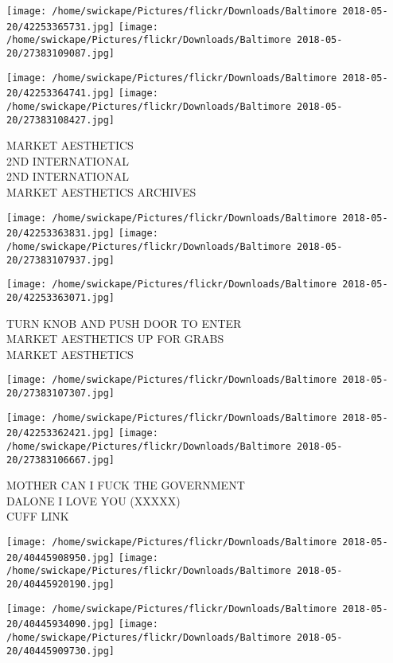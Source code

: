 \documentclass[10pt,letterpaper]{article}
\begin{document}
\texttt{[image: /home/swickape/Pictures/flickr/Downloads/Baltimore 2018-05-20/42253365731.jpg]}
\texttt{[image: /home/swickape/Pictures/flickr/Downloads/Baltimore 2018-05-20/27383109087.jpg]}

\texttt{[image: /home/swickape/Pictures/flickr/Downloads/Baltimore 2018-05-20/42253364741.jpg]}
\texttt{[image: /home/swickape/Pictures/flickr/Downloads/Baltimore 2018-05-20/27383108427.jpg]}

MARKET AESTHETICS\\
2ND INTERNATIONAL\\
2ND INTERNATIONAL\\
MARKET AESTHETICS ARCHIVES
\pagebreak

\texttt{[image: /home/swickape/Pictures/flickr/Downloads/Baltimore 2018-05-20/42253363831.jpg]}
\texttt{[image: /home/swickape/Pictures/flickr/Downloads/Baltimore 2018-05-20/27383107937.jpg]}

\texttt{[image: /home/swickape/Pictures/flickr/Downloads/Baltimore 2018-05-20/42253363071.jpg]}

TURN KNOB AND PUSH DOOR TO ENTER\\
MARKET AESTHETICS UP FOR GRABS\\
MARKET AESTHETICS
\pagebreak

\texttt{[image: /home/swickape/Pictures/flickr/Downloads/Baltimore 2018-05-20/27383107307.jpg]}

\vspace{0.25in}
\texttt{[image: /home/swickape/Pictures/flickr/Downloads/Baltimore 2018-05-20/42253362421.jpg]}
\texttt{[image: /home/swickape/Pictures/flickr/Downloads/Baltimore 2018-05-20/27383106667.jpg]}

MOTHER CAN I FUCK THE GOVERNMENT\\
DALONE I LOVE YOU (XXXXX)\\
CUFF LINK
\pagebreak

\texttt{[image: /home/swickape/Pictures/flickr/Downloads/Baltimore 2018-05-20/40445908950.jpg]}
\texttt{[image: /home/swickape/Pictures/flickr/Downloads/Baltimore 2018-05-20/40445920190.jpg]}

\texttt{[image: /home/swickape/Pictures/flickr/Downloads/Baltimore 2018-05-20/40445934090.jpg]}
\texttt{[image: /home/swickape/Pictures/flickr/Downloads/Baltimore 2018-05-20/40445909730.jpg]}
\end{document}

